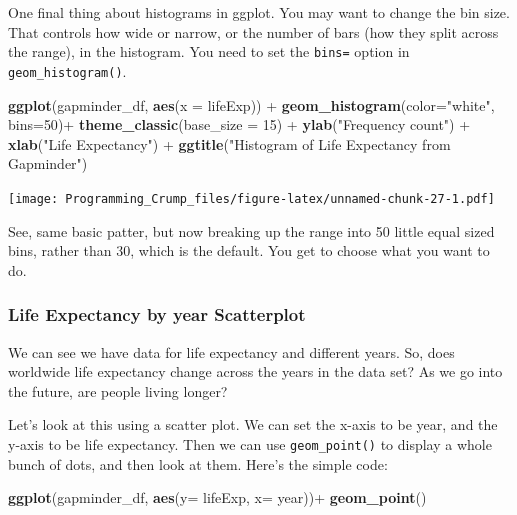\documentclass[]{book}
\newenvironment{Shaded}{\begin{snugshade}}{\end{snugshade}}
\newcommand{\KeywordTok}[1]{\textcolor[rgb]{0.13,0.29,0.53}{\textbf{{#1}}}}
\newcommand{\DataTypeTok}[1]{\textcolor[rgb]{0.13,0.29,0.53}{{#1}}}
\newcommand{\DecValTok}[1]{\textcolor[rgb]{0.00,0.00,0.81}{{#1}}}
\newcommand{\StringTok}[1]{\textcolor[rgb]{0.31,0.60,0.02}{{#1}}}
\newcommand{\NormalTok}[1]{{#1}}
\theoremstyle{definition}
\theoremstyle{definition}
\theoremstyle{definition}
\theoremstyle{remark}
\begin{document}
One final thing about histograms in ggplot. You may want to change the
bin size. That controls how wide or narrow, or the number of bars (how
they split across the range), in the histogram. You need to set the
\texttt{bins=} option in \texttt{geom\_histogram()}.

\begin{Shaded}
\begin{Highlighting}[]
\KeywordTok{ggplot}\NormalTok{(gapminder_df, }\KeywordTok{aes}\NormalTok{(}\DataTypeTok{x =} \NormalTok{lifeExp)) +}
\StringTok{  }\KeywordTok{geom_histogram}\NormalTok{(}\DataTypeTok{color=}\StringTok{"white"}\NormalTok{, }\DataTypeTok{bins=}\DecValTok{50}\NormalTok{)+}\StringTok{ }
\StringTok{  }\KeywordTok{theme_classic}\NormalTok{(}\DataTypeTok{base_size =} \DecValTok{15}\NormalTok{) +}
\StringTok{  }\KeywordTok{ylab}\NormalTok{(}\StringTok{"Frequency count"}\NormalTok{) +}\StringTok{ }
\StringTok{  }\KeywordTok{xlab}\NormalTok{(}\StringTok{"Life Expectancy"}\NormalTok{) +}
\StringTok{  }\KeywordTok{ggtitle}\NormalTok{(}\StringTok{"Histogram of Life Expectancy from Gapminder"}\NormalTok{)}
\end{Highlighting}
\end{Shaded}

\texttt{[image: Programming\_Crump\_files/figure-latex/unnamed-chunk-27-1.pdf]}

See, same basic patter, but now breaking up the range into 50 little
equal sized bins, rather than 30, which is the default. You get to
choose what you want to do.

\subsubsection{Life Expectancy by year
Scatterplot}\label{life-expectancy-by-year-scatterplot}

We can see we have data for life expectancy and different years. So,
does worldwide life expectancy change across the years in the data set?
As we go into the future, are people living longer?

Let's look at this using a scatter plot. We can set the x-axis to be
year, and the y-axis to be life expectancy. Then we can use
\texttt{geom\_point()} to display a whole bunch of dots, and then look
at them. Here's the simple code:

\begin{Shaded}
\begin{Highlighting}[]
\KeywordTok{ggplot}\NormalTok{(gapminder_df, }\KeywordTok{aes}\NormalTok{(}\DataTypeTok{y=} \NormalTok{lifeExp, }\DataTypeTok{x=} \NormalTok{year))+}
\StringTok{  }\KeywordTok{geom_point}\NormalTok{()}
\end{Highlighting}
\end{Shaded}
\end{document}
